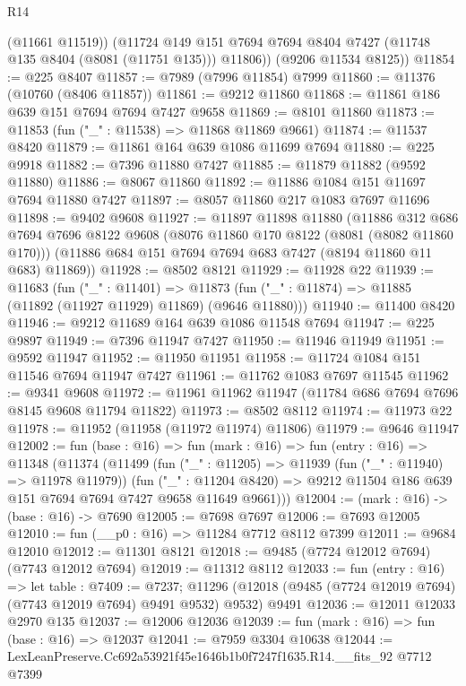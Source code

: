 \begin{lexlean}{R14}
\begin{coremodule}
          (@11661 @11519))
        (@11724 @149 @151 @7694 @7694 @8404 @7427 (@11748 @135 @8404 (@8081 (@11751 @135))) @11806))
      (@9206 @11534 @8125))
@11854 := @225 @8407
@11857 := @7989 (@7996 @11854) @7999
@11860 := @11376 (@10760 (@8406 @11857))
@11861 := @9212 @11860
@11868 := @11861 @186 @639 @151 @7694 @7694 @7427 @9658
@11869 := @8101 @11860
@11873 := @11853 (fun ("_" : @11538) => @11868 @11869 @9661)
@11874 := @11537 @8420
@11879 := @11861 @164 @639 @1086 @11699 @7694
@11880 := @225 @9918
@11882 := @7396 @11880 @7427
@11885 := @11879 @11882 (@9592 @11880)
@11886 := @8067 @11860
@11892 := @11886 @1084 @151 @11697 @7694 @11880 @7427
@11897 := @8057 @11860 @217 @1083 @7697 @11696
@11898 := @9402 @9608
@11927 := @11897
    @11898
    @11880
    (@11886
      @312
      @686
      @7694
      @7696
      @8122
      @9608
      (@8076 @11860 @170 @8122 (@8081 (@8082 @11860 @170)))
      (@11886 @684 @151 @7694 @7694 @683 @7427 (@8194 @11860 @11 @683) @11869))
@11928 := @8502 @8121
@11929 := @11928 @22
@11939 := @11683
    (fun ("_" : @11401) =>
    @11873 (fun ("_" : @11874) => @11885 (@11892 (@11927 @11929) @11869) (@9646 @11880)))
@11940 := @11400 @8420
@11946 := @9212 @11689 @164 @639 @1086 @11548 @7694
@11947 := @225 @9897
@11949 := @7396 @11947 @7427
@11950 := @11946 @11949
@11951 := @9592 @11947
@11952 := @11950 @11951
@11958 := @11724 @1084 @151 @11546 @7694 @11947 @7427
@11961 := @11762 @1083 @7697 @11545
@11962 := @9341 @9608
@11972 := @11961 @11962 @11947 (@11784 @686 @7694 @7696 @8145 @9608 @11794 @11822)
@11973 := @8502 @8112
@11974 := @11973 @22
@11978 := @11952 (@11958 (@11972 @11974) @11806)
@11979 := @9646 @11947
@12002 := fun (base : @16) =>
  fun (mark : @16) =>
  fun (entry : @16) =>
  @11348
    (@11374
      (@11499
        (fun ("_" : @11205) => @11939 (fun ("_" : @11940) => @11978 @11979))
        (fun ("_" : @11204 @8420) =>
        @9212 @11504 @186 @639 @151 @7694 @7694 @7427 @9658 @11649 @9661)))
@12004 := (mark : @16) -> (base : @16) -> @7690
@12005 := @7698 @7697
@12006 := @7693 @12005
@12010 := fun (__p0 : @16) => @11284 @7712 @8112 @7399
@12011 := @9684 @12010
@12012 := @11301 @8121
@12018 := @9485 (@7724 @12012 @7694) (@7743 @12012 @7694)
@12019 := @11312 @8112
@12033 := fun (entry : @16) =>
  let table : @7409 := @7237;
  @11296 (@12018 (@9485 (@7724 @12019 @7694) (@7743 @12019 @7694) @9491 @9532) @9532) @9491
@12036 := @12011 @12033 @2970 @135
@12037 := @12006 @12036
@12039 := fun (mark : @16) => fun (base : @16) => @12037
@12041 := @7959 @3304 @10638
@12044 := LexLeanPreserve.Cc692a53921f45e1646b1b0f7247f1635.R14.__fits_92 @7712 @7399

\end{coremodule}
\end{lexlean}
